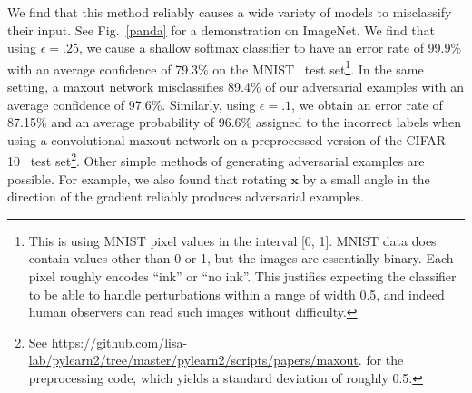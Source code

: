 \documentclass{article} %
\def\eps{{\epsilon}}
\def\veta{{\bm{\eta}}}
\def\vtheta{{\bm{\theta}}}
\def\vx{{\bm{x}}}
\begin{document}

We find that this method reliably causes a wide variety of models to misclassify their input.
See Fig.~\ref{panda} for a demonstration on ImageNet.
We find that using $\eps=.25$, we cause a shallow softmax classifier to have an error rate of 99.9\% with an average confidence of
79.3\% on the MNIST~\citep{LeCun+98} test set\footnote{This is using MNIST pixel values in the interval [0, 1]. MNIST data
does contain values other than 0 or 1, but the images are essentially binary. Each pixel roughly encodes
``ink'' or ``no ink''. This justifies expecting the classifier to be able to handle perturbations
within a range of width 0.5, and indeed human observers can read such images without difficulty.
}. In the same setting, a maxout network misclassifies 89.4\%
of our adversarial examples with an average confidence of 97.6\%.
Similarly, using $\eps=.1$, we obtain an error rate of 87.15\% and an average probability of
96.6\% assigned to the incorrect labels
when using
a convolutional maxout network on a preprocessed version of the CIFAR-10~\citep{KrizhevskyHinton2009} test set\footnote{
    See \url{https://github.com/lisa-lab/pylearn2/tree/master/pylearn2/scripts/papers/maxout}.
    for the preprocessing code, which yields a standard deviation of roughly 0.5.
}. Other simple methods of generating adversarial examples are possible. For example, we also found that rotating
$\vx$ by a small angle in the direction of the gradient reliably produces adversarial examples.
\end{document}
